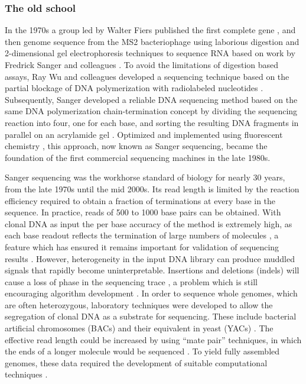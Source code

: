 \subsubsection{The old school}

In the 1970s a group led by Walter Fiers published the first complete gene \cite{jou1972nucleotide}, and then genome sequence \cite{fiers1976complete} from the MS2 bacteriophage using laborious digestion and 2-dimensional gel electrophoresis techniques to sequence RNA based on work by Fredrick Sanger and colleagues \cite{sanger1965two, adams1969nucleotide}.
To avoid the limitations of digestion based assays, Ray Wu and colleagues developed a sequencing technique based on the partial blockage of DNA polymerization with radiolabeled nucleotides \cite{wu1972nucleotide, padmanabhan1974chemical}.
Subsequently, Sanger developed a reliable DNA sequencing method based on the same DNA polymerization chain-termination concept by dividing the sequencing reaction into four, one for each base, and sorting the resulting DNA fragments in parallel on an acrylamide gel \cite{sanger1977dna}.
Optimized and implemented using fluorescent chemistry \cite{strauss1986specific}, this approach, now known as Sanger sequencing, became the foundation of the first commercial sequencing machines in the late 1980s.

Sanger sequencing was the workhorse standard of biology for nearly 30 years, from the late 1970s until the mid 2000s.
Its read length is limited by the reaction efficiency required to obtain a fraction of terminations at every base in the sequence.
In practice, reads of 500 to 1000 base pairs can be obtained.
With clonal DNA as input the per base accuracy of the method is extremely high, as each base readout reflects the termination of large numbers of molecules \cite{castiblanco2013primer}, a feature which has ensured it remains important for validation of sequencing results \cite{sikkema2013targeted}.
However, heterogeneity in the input DNA library can produce muddled signals that rapidly become uninterpretable.
Insertions and deletions (indels) will cause a loss of phase in the sequencing trace \cite{tenney2007tale}, a problem which is still encouraging algorithm development \cite{hill2014poly}.
In order to sequence whole genomes, which are often heterozygous, laboratory techniques were developed to allow the segregation of clonal DNA as a substrate for sequencing.
These include bacterial artificial chromosomes (BACs) and their equivalent in yeast (YACs) \cite{monaco1994yacs}.
The effective read length could be increased by using ``mate pair'' techniques, in which the ends of a longer molecule would be sequenced \cite{schmitt1996framework}.
To yield fully assembled genomes, these data required the development of suitable computational techniques \cite{myers2000whole}.

